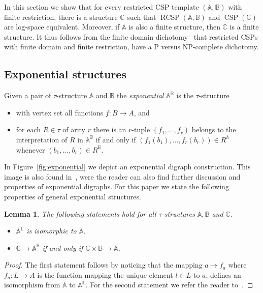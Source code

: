 \documentclass{article}
\newtheorem{lemma}[theorem]{Lemma}
\theoremstyle{definition}
\theoremstyle{remark}
\DeclareMathOperator{\CSP}{CSP}
\DeclareMathOperator{\RCSP}{RCSP}
\newcommand{\bA}{{\mathbb A}}
\newcommand{\bB}{{\mathbb B}}
\newcommand{\bC}{{\mathbb C}}
\newcommand{\bL}{{\mathbb L}}
\begin{document}
In this section we show that for every restricted CSP template $(\bA,\bB)$ with finite restriction,
there is a structure $\bC$ such that $\RCSP(\bA,\bB)$ and $\CSP(\bC)$ are log-space equivalent. 
Moreover, if $\bA$ is also a finite structure, then $\bC$ is a finite structure. It thus follows
from the finite domain dichotomy~\cite{BulatovFVConjecture,ZhukFVConjecture} that restricted CSPs
with finite domain and finite restriction, have a P versus NP-complete dichotomy. 

\subsection{Exponential structures}

Given a pair of $\tau$-structure $\bA$ and $\bB$ the \emph{exponential} $\bA^\bB$ is the $\tau$-structure 
\begin{itemize}
    \item with vertex set all functions $f\colon B\to A$, and
    \item for each $R\in\tau$ of arity $r$ there is an $r$-tuple $(f_1,\dots, f_r)$ belongs
    to the interpretation of $R$ in $\bA^\bB$
    if and only if $(f_1(b_1),\dots, f_r(b_r))\in R^\bA$ whenever $(b_1,\dots, b_r) \in R^\bB$.
\end{itemize}
In Figure~\ref{fig:exponential} we depict an exponential digraph construction. This image is also
found in~\cite{HellNesetril}, were the reader can also find further discussion and properties
of exponential digraphs. For this paper we state the following properties of general exponential
structures.

\begin{lemma}\label{lem:properties-exponential}
    The following statements hold for all $\tau$-structures $\bA,\bB$ and $\bC$.
    \begin{itemize}
        \item $\bA^\bL$ is isomorphic to $\bA$. 
        \item $\bC\to \bA^\bB$ if and only if $\bC\times \bB\to \bA$.
    \end{itemize}
\end{lemma}
\begin{proof}
    The first statement follows by noticing that the mapping $a\mapsto f_a$ where $f_a\colon L\to A$
    is the function mapping the unique element $l\in L$ to $a$, defines an isomorphism
    from $\bA$ to $\bA^\bL$.
    For the second statement we refer the reader to~\cite[Corollary 1.5.12]{Foniok-Thesis}.
\end{proof}
\end{document}
